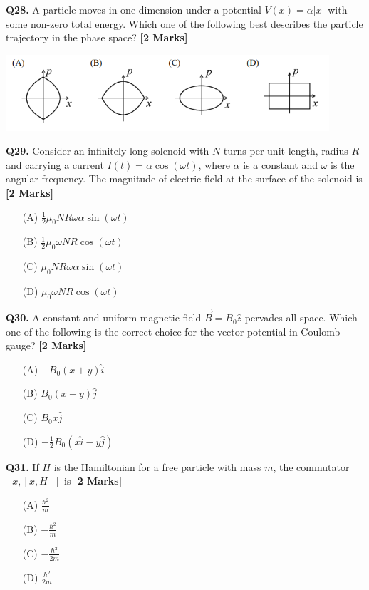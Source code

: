 \documentclass[11pt]{article}
\newcommand{\questionb}[2]{
    \noindent\textbf{Q#2.} #1 \hfill \textbf{[2 Marks]}
}
\begin{document}
\questionb{A particle moves in one dimension under a potential \(V(x) = \alpha |x|\) with some non-zero total energy. Which one of the following best describes the particle trajectory in the phase space?}{28}
\begin{center}
\includegraphics[width=0.9\textwidth]{figures/28.png}
\end{center}
\vspace{0.5cm}

\questionb{Consider an infinitely long solenoid with \(N\) turns per unit length, radius \(R\) and carrying a current \(I(t) = \alpha \cos(\omega t)\), where \(\alpha\) is a constant and \(\omega\) is the angular frequency. The magnitude of electric field at the surface of the solenoid is}{29}
\begin{enumerate}
    \item[(A)] \(\frac{1}{2} \mu_0 N R \omega \alpha \sin(\omega t)\)  
    \item[(B)] \(\frac{1}{2} \mu_0 \omega N R \cos(\omega t)\)  
    \item[(C)] \(\mu_0 N R \omega \alpha \sin(\omega t)\)  
    \item[(D)] \(\mu_0 \omega N R \cos(\omega t)\)  
\end{enumerate}
\vspace{0.5cm}

\questionb{A constant and uniform magnetic field \(\vec{B} = B_0 \hat{z}\) pervades all space. Which one of the following is the correct choice for the vector potential in Coulomb gauge?}{30}
\begin{enumerate}
    \item[(A)] \(-B_0(x + y)\hat{i}\)  
    \item[(B)] \(B_0(x + y)\hat{j}\)  
    \item[(C)] \(B_0 x \hat{j}\)  
    \item[(D)] \(-\frac{1}{2}B_0(x\hat{i} - y\hat{j})\)  
\end{enumerate}
\vspace{0.5cm}

\questionb{If \(H\) is the Hamiltonian for a free particle with mass \(m\), the commutator \([x, [x, H]]\) is}{31}
\begin{enumerate}
    \item[(A)] \(\frac{\hbar^2}{m}\)  
    \item[(B)] \(-\frac{\hbar^2}{m}\)  
    \item[(C)] \(-\frac{\hbar^2}{2m}\)  
    \item[(D)] \(\frac{\hbar^2}{2m}\)  
\end{enumerate}
\vspace{0.5cm}
\end{document}
